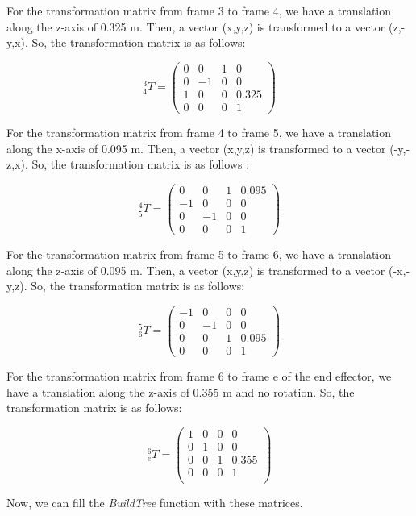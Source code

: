 For the transformation matrix from frame 3 to frame 4, we have a translation along the z-axis of 0.325 m. Then, a vector (x,y,z) is transformed to a vector (z,-y,x). So, the transformation matrix is as follows: 

\[^3_4 T = \begin{pmatrix}
        0 & 0 & 1 & 0 \\
        0 & -1 & 0 & 0 \\
        1 & 0 & 0 & 0.325 \\
        0 & 0 & 0 & 1 
    \end{pmatrix}\]

For the transformation matrix from frame 4 to frame 5, we have a translation along the x-axis of 0.095 m. Then, a vector (x,y,z) is transformed to a vector (-y,-z,x). So, the transformation matrix is as follows : 

\[^4_5 T = \begin{pmatrix}
        0 & 0 & 1 & 0.095 \\
        -1 & 0 & 0 & 0 \\
        0 & -1 & 0 & 0 \\
        0 & 0 & 0 & 1 
    \end{pmatrix}\]

For the transformation matrix from frame 5 to frame 6, we have a translation along the z-axis of 0.095 m. Then, a vector (x,y,z) is transformed to a vector (-x,-y,z). So, the transformation matrix is as follows: 

\[^5_6 T = \begin{pmatrix}
        -1 & 0 & 0 & 0 \\
        0 & -1 & 0 & 0 \\
        0 & 0 & 1 & 0.095 \\
        0 & 0 & 0 & 1 
    \end{pmatrix}\]
    
For the transformation matrix from frame 6 to frame e of the end effector, we have a translation along the z-axis of 0.355 m and no rotation. So, the transformation matrix is as follows: 

\[^6_e T = \begin{pmatrix}
        1 & 0 & 0 & 0 \\
        0 & 1 & 0 & 0 \\
        0 & 0 & 1 & 0.355 \\
        0 & 0 & 0 & 1 \\
    \end{pmatrix}\]

Now, we can fill the \textit{BuildTree} function with these matrices.

\newpage